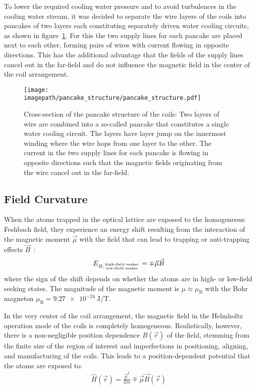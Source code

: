 To lower the required cooling water pressure and to avoid turbulences in the cooling water stream, it was decided to separate the wire layers of the coils into pancakes of two layers each constituting separately driven water cooling circuits, as shown in figure~\ref{fig:pancake_structure}. For this the two supply lines for each pancake are placed next to each other, forming pairs of wires with current flowing in opposite directions. This has the additional advantage that the fields of the supply lines cancel out in the far-field and do not influence the magnetic field in the center of the coil arrangement.

\begin{figure}
    \centering
    \texttt{[image: \\imagepath/pancake\_structure/pancake\_structure.pdf]}
    \caption{Cross-section of the pancake structure of the coils: Two layers of wire are combined into a so-called pancake that constitutes a single water cooling circuit. The layers have layer jump on the innermost winding where the wire hops from one layer to the other. The current in the two supply lines for each pancake is flowing in opposite directions such that the magnetic fields originating from the wire cancel out in the far-field.}
    \label{fig:pancake_structure}
\end{figure}

\subsection*{Field Curvature}
When the atoms trapped in the optical lattice are exposed to the homogeneous Feshbach field, they experience an energy shift resulting from the interaction of the magnetic moment $\vec \mu$ with the field that can lead to trapping or anti-trapping effects $\vec B$~\cite{pritchard_cooling_1983,gehm_properties_2003, hagemann_setup_2020}:
\begin{align}
    E_{B, {\text{high-field seeker} \atop \text{low-field seeker}}} = \mp \vec \mu \vec B
\end{align}
where the sign of the shift depends on whether the atoms are in high- or low-field seeking states. The magnitude of the magnetic moment is $\mu \approx \mu_\text{B}$ with the Bohr magneton $\mu_\text{B} = \SI{9.27e-24}{\joule\per\tesla}$.

In the very center of the coil arrangement, the magnetic field in the Helmholtz operation mode of the coils is completely homogeneous. Realistically, however, there is a non-negligible position dependence $B(\vec r)$ of the field, stemming from the finite size of the region of interest and imperfections in positioning, aligning, and manufacturing of the coils. This leads to a position-dependent potential that the atoms are exposed to:
\begin{align}
    \hat H(\vec r) = \frac{\vec p^2}{2m} \mp \vec \mu \vec B(\vec r)
\end{align}

